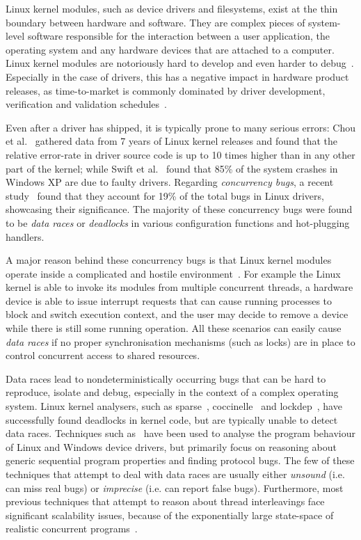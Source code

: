 Linux kernel modules, such as device drivers and filesystems, exist at the thin boundary between hardware and software. They are complex pieces of system-level software responsible for the interaction between a user application, the operating system and any hardware devices that are attached to a computer. Linux kernel modules are notoriously hard to develop and even harder to debug~\cite{corbet2005linux}. Especially in the case of drivers, this has a negative impact in hardware product releases, as time-to-market is commonly dominated by driver development, verification and validation schedules~\cite{yavatkar2012era}.

Even after a driver has shipped, it is typically prone to many serious errors: Chou et al.~\cite{chou2001empirical} gathered data from 7 years of Linux kernel releases and found that the relative error-rate in driver source code is up to 10 times higher than in any other part of the kernel; while Swift et al.~\cite{Swift2003windowsxp} found that 85\% of the system crashes in Windows XP are due to faulty drivers. Regarding \emph{concurrency bugs}, a recent study~\cite{ryzhyk2009dingo} found that they account for 19\% of the total bugs in Linux drivers, showcasing their significance. The majority of these concurrency bugs were found to be \emph{data races} or \emph{deadlocks} in various configuration functions and hot-plugging handlers.

A major reason behind these concurrency bugs is that Linux kernel modules operate inside a complicated and hostile environment~\cite{corbet2005linux}. For example the Linux kernel is able to invoke its modules from multiple concurrent threads, a hardware device is able to issue interrupt requests that can cause running processes to block and switch execution context, and the user may decide to remove a device while there is still some running operation. All these scenarios can easily cause \emph{data races} if no proper synchronisation mechanisms (such as locks) are in place to control concurrent access to shared resources.

Data races lead to nondeterministically occurring bugs that can be hard to reproduce, isolate and debug, especially in the context of a complex operating system. Linux kernel analysers, such as sparse~\cite{corbet2004sparse}, coccinelle~\cite{padioleau2008doc} and lockdep~\cite{corbet2006lock}, have successfully found deadlocks in kernel code, but are typically unable to detect data races. Techniques such as~\cite{ball2006thorough, clarke2004predicate, qadeer2004kiss, engler2000checking, henzinger2002temporal, cook2006termination, pratikakis2006locksmith, kuznetsov2010testing, renzelmann2012symdrive, lal2012corral} have been used to analyse the program behaviour of Linux and Windows device drivers, but primarily focus on reasoning about generic sequential program properties and finding protocol bugs. The few of these techniques that attempt to deal with data races are usually either \emph{unsound} (i.e. can miss real bugs) or \emph{imprecise} (i.e. can report false bugs). Furthermore, most previous techniques that attempt to reason about thread interleavings face significant scalability issues, because of the exponentially large state-space of realistic concurrent programs~\cite{musuvathi2008finding}.

